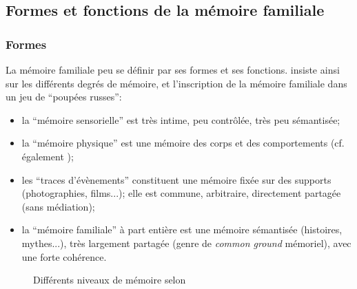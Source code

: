 \documentclass[french]{article}
\begin{document}
		\subsection{Formes et fonctions de la mémoire familiale}\label{formefonc}
			\subsubsection{Formes}
			La mémoire familiale peu se définir par ses formes et ses fonctions. \cite{muxel2012} insiste ainsi sur les différents degrés de mémoire, et l'inscription de la mémoire familiale dans un jeu de ``poupées russes'':
			\begin{itemize}
				\item la ``mémoire sensorielle'' est très intime, peu contrôlée, très peu sémantisée;
				\item la ``mémoire physique'' est une mémoire des corps et des comportements (cf. également \cite[p.~121]{halbwachs1925});
				\item les ``traces d'évènements'' constituent une mémoire fixée sur des supports (photographies, films...); elle est commune, arbitraire, directement partagée (sans médiation);
				\item la ``mémoire familiale'' à part entière est une mémoire sémantisée (histoires, mythes...), très largement partagée (genre de \textit{common ground} mémoriel), avec une forte cohérence.
			\end{itemize}
			\begin{figure}[H]
			\centering
			\caption{Différents niveaux de mémoire selon \cite{muxel2012}}
		\end{figure}
\end{document}
